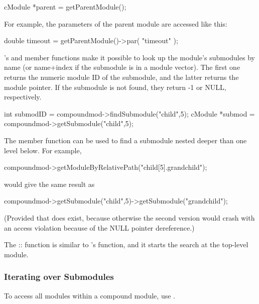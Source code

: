 \begin{cpp}
cModule *parent = getParentModule();
\end{cpp}

For example, the parameters of the parent module are accessed
like this:

\begin{cpp}
double timeout = getParentModule()->par( "timeout" );
\end{cpp}


's  and 
member functions make it possible to look up the module's submodules
by name (or name+index if the submodule
is in a module vector). The first one returns the numeric module ID of
the submodule, and the latter returns the module pointer.  If the
submodule is not found, they return -1 or NULL, respectively.

\begin{cpp}
int submodID = compoundmod->findSubmodule("child",5);
cModule *submod = compoundmod->getSubmodule("child",5);
\end{cpp}


The  member function can be used to find
a submodule nested deeper than one level below. For example,

\begin{cpp}
compoundmod->getModuleByRelativePath("child[5].grandchild");
\end{cpp}

would give the same result as

\begin{cpp}
compoundmod->getSubmodule("child",5)->getSubmodule("grandchild");
\end{cpp}

(Provided that  does exist, because otherwise the second
version would crash with an access violation because of the NULL
pointer dereference.)


The :: function is similar
to 's  function, and it
starts the search at the top-level module.


\subsubsection{Iterating over Submodules}


To access all modules within a compound module,
use .

